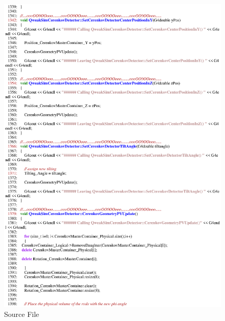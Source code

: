 \begin{figure}[ht]
  \hspace{0cm}
  \includegraphics[scale=0.8]{./figures5/QweakSimCerenkovDetector.cc-p22.eps}
  \caption{\label{SourceV22} Source File}
           \label{fig:V-SC-26}
\end{figure}
\clearpage

